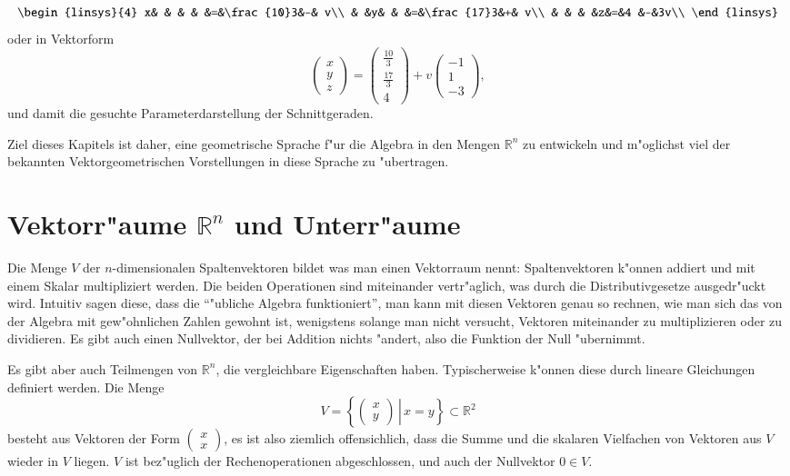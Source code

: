 \begin{equation}
\begin{linsys}{4}
x& & & & &=&\frac{10}3&-& v\\
 & &y& & &=&\frac{17}3&+& v\\
 & & & &z&=&4         &-&3v\\
\end{linsys}
\end{equation}
oder in Vektorform
\begin{equation}
\begin{pmatrix}x\\y\\z\end{pmatrix}
=\begin{pmatrix}\frac{10}3\\\frac{17}3\\4\end{pmatrix}
+v\begin{pmatrix}-1\\1\\-3\end{pmatrix},
\end{equation}
und damit die gesuchte Parameterdarstellung der Schnittgeraden.

Ziel dieses Kapitels ist daher, eine geometrische Sprache f"ur die
Algebra in den Mengen $\mathbb R^n$ zu entwickeln und m"oglichst viel
der bekannten Vektorgeometrischen Vorstellungen in diese Sprache
zu "ubertragen.

\section{Vektorr"aume $\mathbb R^n$ und Unterr"aume}
Die Menge $V$ der $n$-dimensionalen Spaltenvektoren bildet was man
einen Vektorraum nennt: Spaltenvektoren k"onnen addiert und mit
einem Skalar multipliziert werden. Die beiden Operationen sind
miteinander vertr"aglich, was durch die Distributivgesetze ausgedr"uckt
wird. Intuitiv sagen diese, dass die ``"ubliche Algebra funktioniert'',
man kann mit diesen Vektoren genau so rechnen, wie man sich das von
der Algebra mit gew"ohnlichen Zahlen gewohnt ist, wenigstens solange
man nicht versucht, Vektoren miteinander zu multiplizieren oder zu
dividieren.
Es gibt auch einen Nullvektor, der bei Addition nichts "andert,
also die Funktion der Null "ubernimmt.

Es gibt aber auch Teilmengen von $\mathbb R^n$, die vergleichbare
Eigenschaften haben. Typischerweise k"onnen diese durch lineare
Gleichungen definiert werden. Die Menge
\[
V=\left\{\left.\begin{pmatrix}x\\y\end{pmatrix}\,\right|\,x=y\right\}
\subset\mathbb R^2
\]
besteht aus Vektoren der Form $\begin{pmatrix}x\\x\end{pmatrix}$,
es ist also ziemlich offensichlich, dass die Summe und die skalaren
Vielfachen von  Vektoren aus $V$ wieder in $V$ liegen. $V$ ist
bez"uglich der Rechenoperationen abgeschlossen, und auch der Nullvektor
$0\in V$.

